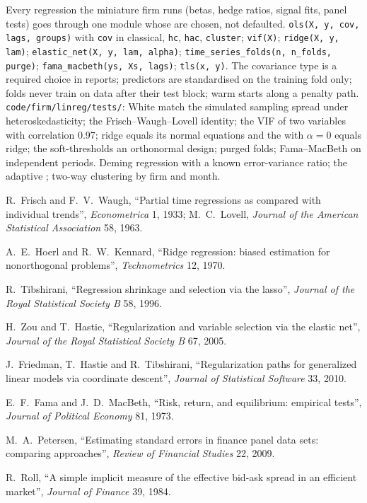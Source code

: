 \begin{build}
 Every regression the miniature firm runs (betas, hedge ratios, signal fits, panel tests) goes through one module whose
 are chosen, not defaulted.
 \texttt{ols(X, y, cov, lags, groups)} with \texttt{cov} in classical, \texttt{hc}, \texttt{hac}, \texttt{cluster};
\texttt{vif(X)}; \texttt{ridge(X, y, lam)}; \texttt{elastic\_net(X, y, lam, alpha)}; \texttt{time\_series\_folds(n, n\_folds, purge)};
\texttt{fama\_macbeth(ys, Xs, lags)}; \texttt{tls(x, y)}.
 The covariance type is a required choice in reports; predictors are standardised on the training fold only; folds never train on
data after their test block; warm starts along a penalty path.
 \texttt{code/firm/linreg/tests/}: White  match the simulated sampling spread under heteroskedasticity;
the Frisch--Waugh--Lovell identity; the VIF of two variables with correlation 0.97; ridge equals its normal equations and the  with
$\alpha = 0$ equals ridge; the  soft-thresholds an orthonormal design; purged folds; Fama--MacBeth on independent periods.
 Deming regression with a known error-variance ratio; the adaptive ; two-way clustering by firm and month.
\end{build}

\begin{omsources}
\item R.~Frisch and F.~V.~Waugh, ``Partial time regressions as compared with individual trends'', \emph{Econometrica} 1, 1933; M.~C.~Lovell,
\emph{Journal of the American Statistical Association} 58, 1963.
\item A.~E.~Hoerl and R.~W.~Kennard, ``Ridge regression: biased estimation for nonorthogonal problems'', \emph{Technometrics} 12, 1970.
\item R.~Tibshirani, ``Regression shrinkage and selection via the lasso'', \emph{Journal of the Royal Statistical Society B} 58, 1996.
\item H.~Zou and T.~Hastie, ``Regularization and variable selection via the elastic net'', \emph{Journal of the Royal Statistical Society B}
67, 2005.
\item J.~Friedman, T.~Hastie and R.~Tibshirani, ``Regularization paths for generalized linear models via coordinate descent'', \emph{Journal of
Statistical Software} 33, 2010.
\item E.~F.~Fama and J.~D.~MacBeth, ``Risk, return, and equilibrium: empirical tests'', \emph{Journal of Political Economy} 81, 1973.
\item M.~A.~Petersen, ``Estimating standard errors in finance panel data sets: comparing approaches'', \emph{Review of Financial Studies} 22, 2009.
\item R.~Roll, ``A simple implicit measure of the effective bid-ask spread in an efficient market'', \emph{Journal of Finance} 39, 1984.
\end{omsources}

